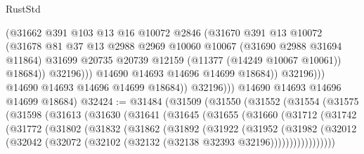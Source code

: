 \begin{lexlean}{RustStd}
\begin{coremodule}
                              (@31662
                                @391
                                @103
                                @13
                                @16
                                @10072
                                @2846
                                (@31670
                                  @391
                                  @13
                                  @10072
                                  (@31678
                                    @81
                                    @37
                                    @13
                                    @2988
                                    @2969
                                    @10060
                                    @10067
                                    (@31690 @2988 @31694 @11864)
                                    @31699
                                    @20735
                                    @20739
                                    @12159
                                    (@11377 (@14249 @10067 @10061))
                                    @18684))
                                @32196)))
                          @14690
                          @14693
                          @14696
                          @14699
                          @18684))
                      @32196)))
                @14690
                @14693
                @14696
                @14699
                @18684))
            @32196)))
      @14690
      @14693
      @14696
      @14699
      @18684)
@32424 := @31484
    (@31509
      (@31550
        (@31552
          (@31554
            (@31575
              (@31598
                (@31613
                  (@31630
                    (@31641
                      (@31645
                        (@31655
                          (@31660
                            (@31712
                              (@31742
                                (@31772
                                  (@31802
                                    (@31832
                                      (@31862
                                        (@31892
                                          (@31922
                                            (@31952
                                              (@31982
                                                (@32012
                                                  (@32042
                                                    (@32072
                                                      (@32102
                                                        (@32132
                                                          (@32138 @32393 @32196)))))))))))))))))

\end{coremodule}
\end{lexlean}
